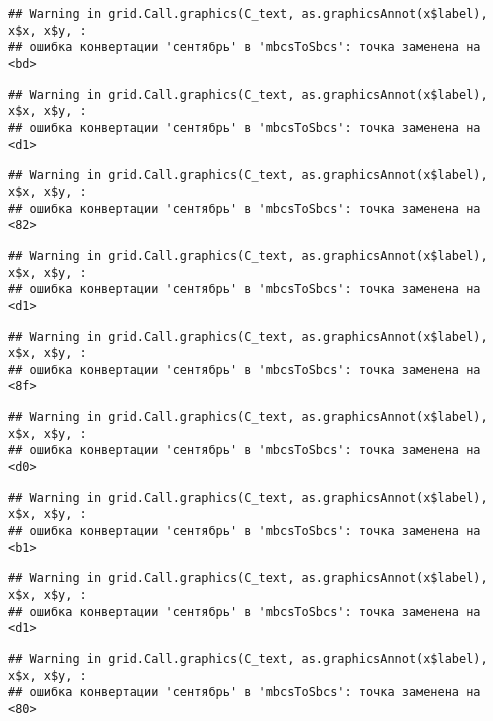 \documentclass[
]{article}
\begin{document}
\begin{verbatim}
## Warning in grid.Call.graphics(C_text, as.graphicsAnnot(x$label), x$x, x$y, :
## ошибка конвертации 'сентябрь' в 'mbcsToSbcs': точка заменена на <bd>
\end{verbatim}

\begin{verbatim}
## Warning in grid.Call.graphics(C_text, as.graphicsAnnot(x$label), x$x, x$y, :
## ошибка конвертации 'сентябрь' в 'mbcsToSbcs': точка заменена на <d1>
\end{verbatim}

\begin{verbatim}
## Warning in grid.Call.graphics(C_text, as.graphicsAnnot(x$label), x$x, x$y, :
## ошибка конвертации 'сентябрь' в 'mbcsToSbcs': точка заменена на <82>
\end{verbatim}

\begin{verbatim}
## Warning in grid.Call.graphics(C_text, as.graphicsAnnot(x$label), x$x, x$y, :
## ошибка конвертации 'сентябрь' в 'mbcsToSbcs': точка заменена на <d1>
\end{verbatim}

\begin{verbatim}
## Warning in grid.Call.graphics(C_text, as.graphicsAnnot(x$label), x$x, x$y, :
## ошибка конвертации 'сентябрь' в 'mbcsToSbcs': точка заменена на <8f>
\end{verbatim}

\begin{verbatim}
## Warning in grid.Call.graphics(C_text, as.graphicsAnnot(x$label), x$x, x$y, :
## ошибка конвертации 'сентябрь' в 'mbcsToSbcs': точка заменена на <d0>
\end{verbatim}

\begin{verbatim}
## Warning in grid.Call.graphics(C_text, as.graphicsAnnot(x$label), x$x, x$y, :
## ошибка конвертации 'сентябрь' в 'mbcsToSbcs': точка заменена на <b1>
\end{verbatim}

\begin{verbatim}
## Warning in grid.Call.graphics(C_text, as.graphicsAnnot(x$label), x$x, x$y, :
## ошибка конвертации 'сентябрь' в 'mbcsToSbcs': точка заменена на <d1>
\end{verbatim}

\begin{verbatim}
## Warning in grid.Call.graphics(C_text, as.graphicsAnnot(x$label), x$x, x$y, :
## ошибка конвертации 'сентябрь' в 'mbcsToSbcs': точка заменена на <80>
\end{verbatim}
\end{document}

